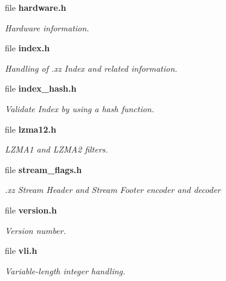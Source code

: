 \begin{DoxyCompactItemize}
file \textbf{ hardware.\+h}
\begin{DoxyCompactList}\small\item\em Hardware information. \end{DoxyCompactList}\item 
file \textbf{ index.\+h}
\begin{DoxyCompactList}\small\item\em Handling of .xz Index and related information. \end{DoxyCompactList}\item 
file \textbf{ index\+\_\+hash.\+h}
\begin{DoxyCompactList}\small\item\em Validate Index by using a hash function. \end{DoxyCompactList}\item 
file \textbf{ lzma12.\+h}
\begin{DoxyCompactList}\small\item\em L\+Z\+M\+A1 and L\+Z\+M\+A2 filters. \end{DoxyCompactList}\item 
file \textbf{ stream\+\_\+flags.\+h}
\begin{DoxyCompactList}\small\item\em .xz Stream Header and Stream Footer encoder and decoder \end{DoxyCompactList}\item 
file \textbf{ version.\+h}
\begin{DoxyCompactList}\small\item\em Version number. \end{DoxyCompactList}\item 
file \textbf{ vli.\+h}
\begin{DoxyCompactList}\small\item\em Variable-\/length integer handling. \end{DoxyCompactList}\end{DoxyCompactItemize}

